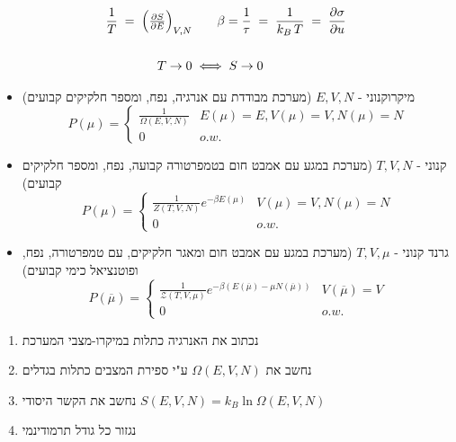 \begin{cheatformula}[טמפרטורה]
     \begin{align*}
        \frac{1}{T} \;=\; \Bigl(\tfrac{\partial S}{\partial E}\Bigr)_{V,N} &\qquad
        \beta = \frac{1}{\tau} \;=\; \frac{1}{k_{B}\,T} \;=\; \frac{\partial\sigma}{\partial u}\, \\\\
        T \to 0 &\iff S \to 0
    \end{align*}
\end{cheatformula}

\begin{cheatformula}[צברים]
\begin{itemize}
 \item מיקרוקנוני - $E,V,N$ (מערכת מבודדת עם אנרגיה, נפח, ומספר חלקיקים קבועים)
 $$
 P \left(\mu\right) = \begin{cases}
     \frac{1}{\Omega \left( E,V,N \right)} & E\left(\mu\right)=E, V\left(\mu\right)=V,N\left(\mu\right)=N\\
     0 & o.w.
 \end{cases}
 $$
 \item קנוני - $T,V,N$ (מערכת במגע עם אמבט חום בטמפרטורה קבועה, נפח, ומספר חלקיקים קבועים)
 $$
 P \left(\mu\right) = \begin{cases}
     \frac{1}{Z \left( T,V,N \right)} e^{-\beta E\left(\mu\right)} &  V\left(\mu\right)=V,N\left(\mu\right)=N\\
     0 & o.w.
 \end{cases}
 $$
 \item גרנד קנוני - $T,V,\mu$ (מערכת במגע עם אמבט חום ומאגר חלקיקים, עם טמפרטורה, נפח, ופוטנציאל כימי קבועים)
 $$
 P \left(\overline{\mu}\right) = \begin{cases}
     \frac{1}{\mathcal{Z} \left( T,V,\mu \right)} e^{-\beta\left( E\left(\overline{\mu}\right) - \mu N\left(\overline{\mu}\right)  \right)} &  V\left(\overline{\mu}\right)=V\\
     0 & o.w.
 \end{cases}
 $$
\end{itemize}
\end{cheatformula}

\begin{cheatformula}
\begin{enumerate}
        \item נכתוב את האנרגיה כתלות במיקרו-מצבי המערכת
        \item נחשב את $\Omega \left( E,V,N \right)$ ע"י ספירת המצבים כתלות בגדלים
        \item נחשב את הקשר היסודי $S\left( E,V,N \right) = k_B \ln \Omega \left( E,V,N \right)$
        \item נגזור כל גודל תרמודינמי 
\end{enumerate}
\end{cheatformula}

